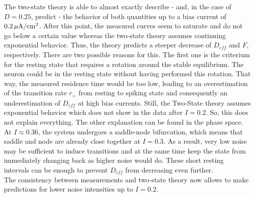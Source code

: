 \documentclass[12pt,a4paper]{article}
\begin{document}
The two-state theory is able to almost exactly describe - and, in the case of $D=0.25$, predict - the behavior of both quantities up to a bias current of $\unit[0.2]{\mu A/\text{cm}^2}$. After this point, the measured curves seem to saturate and do not go below a certain value whereas the two-state theory assumes continuing exponential behavior. Thus, the theory predicts a steeper decrease of $D_{eff}$ and $F$, respectively. There are two possible reasons for this. The first one is the criterium for the resting state that requires a rotation around the stable equilibrium. The neuron could be in the resting state without having performed this rotation. That way, the measured residence time would be too low, leading to an overestimation of the transition rate $r_+$ from resting to spiking state and consequently an underestimation of $D_{eff}$ at high bias currents. Still, the Two-State theory assumes exponential behavior which does not show in the data after $I=0.2$. So, this does not explain everything. The other explanation can be found in the phase space. At $I\approx 0.36$, the system undergoes a saddle-node bifurcation, which means that saddle and node are already close together at $I=0.3$. As a result, very low noise may be sufficient to induce transitions and at the same time keep the state from immediately changing back as higher noise would do. These short resting intervals can be enough to prevent $D_{eff}$ from decreasing even further.
\\
The consistency between measurements and two-state theory
now allows to make predictions for lower noise intensities up to $I=0.2$.
\end{document}
